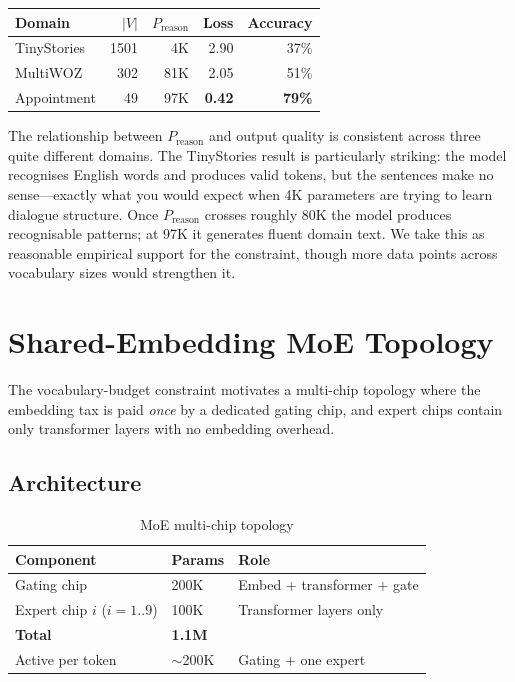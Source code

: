 \documentclass[11pt]{article}
\begin{document}
\begin{center}
\begin{tabular}{lrrrr}
\toprule
Domain & $|V|$ & $P_{\text{reason}}$ & Loss & Accuracy \\
\midrule
TinyStories & 1501 & 4K  & 2.90 & 37\% \\
MultiWOZ    & 302  & 81K & 2.05 & 51\% \\
Appointment & 49   & 97K & \textbf{0.42} & \textbf{79\%} \\
\bottomrule
\end{tabular}
\end{center}

The relationship between $P_{\text{reason}}$ and output quality is consistent across
three quite different domains. The TinyStories result is particularly striking: the
model recognises English words and produces valid tokens, but the sentences make no
sense---exactly what you would expect when 4K parameters are trying to learn dialogue
structure. Once $P_{\text{reason}}$ crosses roughly 80K the model produces recognisable
patterns; at 97K it generates fluent domain text. We take this as reasonable
empirical support for the constraint, though more data points across vocabulary sizes
would strengthen it.

\section{Shared-Embedding MoE Topology}

\label{sec:moe}

The vocabulary-budget constraint motivates a multi-chip topology where the embedding
tax is paid \emph{once} by a dedicated gating chip, and expert chips contain only
transformer layers with no embedding overhead.

\subsection{Architecture}

\begin{table}[ht]
\centering
\small
\begin{tabular}{lll}
\toprule
Component & Params & Role \\
\midrule
Gating chip & 200K & Embed + transformer + gate \\
Expert chip $i$ ($i=1..9$) & 100K & Transformer layers only \\
\midrule
\textbf{Total} & \textbf{1.1M} & \\
Active per token & $\sim$200K & Gating + one expert \\
\bottomrule
\end{tabular}
\caption{MoE multi-chip topology}
\end{table}
\end{document}
